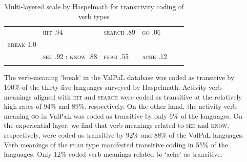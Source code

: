 \documentclass[output=paper,colorlinks,citecolor=brown
]{langscibook}
\begin{document}
\begin{table}
\caption{Multi-layered scale by Haspelmath for transitivity coding of verb types}
\label{tab:schaefer:sheg9}
 \begin{tabularx}{.75\textwidth}{llllll}
  \lsptoprule
            & {\textsc{hit} .94} & {\textsc{search} .89}  & {\textsc{go} .06}\\
  {\textsc{break} 1.0}  &      &       &           &  \\
     &   {\textsc{see} .92 : \textsc{know} .88} &   {\textsc{fear} .55}  &    {\textsc{ache} .12}\\
  \lspbottomrule
 \end{tabularx}
\end{table}

The verb-meaning ‘break’ in the ValPaL database was coded as transitive by 100\% of the thirty-five languages surveyed by Haspelmath. Activity-verb meanings aligned with \textsc{hit} and \textsc{search} were coded as transitive at the relatively high rates of 94\% and 89\%, respectively. On the other hand, the activity-verb meaning \textsc{go} in ValPaL was coded as transitive by only 6\% of the languages. On the experiential layer, we find that verb meanings related to \textsc{see} and \textsc{know}, respectively, were coded as transitive by 92\% and 88\% of the ValPaL languages. Verb meanings of the \textsc{fear} type manifested transitive coding in 55\% of the languages. Only 12\% coded verb meanings related to ‘ache’ as transitive. 
\end{document}
